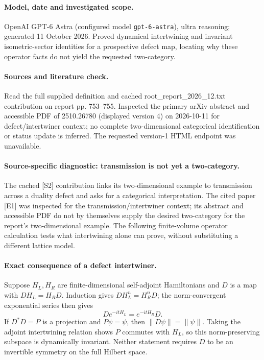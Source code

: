 \documentclass[11pt]{article}
\begin{document}
\paragraph{Model, date and investigated scope.}
OpenAI GPT-6 Astra (configured model \texttt{gpt-6-astra}), ultra reasoning; generated 11 October 2026. Proved dynamical intertwining and invariant isometric-sector identities for a prospective defect map, locating why these operator facts do not yield the requested two-category.

\paragraph{Sources and literature check.}
Read the full supplied definition and cached root\_report\_2026\_12.txt contribution on report pp. 753–755. Inspected the primary arXiv abstract and accessible PDF of 2510.26780 (displayed version 4) on 2026-10-11 for defect/intertwiner context; no complete two-dimensional categorical identification or status update is inferred. The requested version-1 HTML endpoint was unavailable.

\paragraph{Source-specific diagnostic: transmission is not yet a two-category.} The cached [S2] contribution links its two-dimensional example to transmission across a duality defect and asks for a categorical interpretation. The cited paper [E1] was inspected for the transmission/intertwiner context; its abstract and accessible PDF do not by themselves supply the desired two-category for the report's two-dimensional example. The following finite-volume operator calculation tests what intertwining alone can prove, without substituting a different lattice model.
\paragraph{Exact consequence of a defect intertwiner.} Suppose \(H_L,H_R\) are finite-dimensional self-adjoint Hamiltonians and \(D\) is a map with \(DH_L=H_RD\). Induction gives \(DH_L^n=H_R^nD\); the norm-convergent exponential series then gives
\[
 De^{-itH_L}=e^{-itH_R}D.
\]
If \(D^*D=P\) is a projection and \(P\psi=\psi\), then \(\|D\psi\|=\|\psi\|\). Taking the adjoint intertwining relation shows \(P\) commutes with \(H_L\), so this norm-preserving subspace is dynamically invariant. Neither statement requires \(D\) to be an invertible symmetry on the full Hilbert space.
\end{document}
